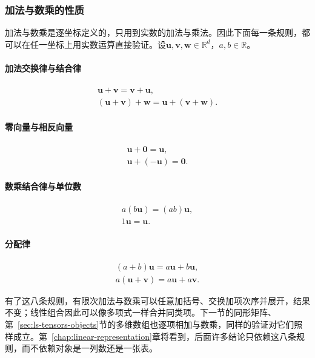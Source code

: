 \subsubsection{加法与数乘的性质}
\label{sec:ls-vector-operation-rules}

加法与数乘是逐坐标定义的，只用到实数的加法与乘法。因此下面每一条规则，都可以在任一坐标上用实数运算直接验证。设$\bm u,\bm v,\bm w\in\mathbb R^d$，$a,b\in\mathbb R$。

\paragraph{加法交换律与结合律}
\[
 \begin{gathered}
 \bm u+\bm v=\bm v+\bm u,\\
 (\bm u+\bm v)+\bm w=\bm u+(\bm v+\bm w).
 \end{gathered}
\]

\paragraph{零向量与相反向量}
\[
 \begin{gathered}
 \bm u+\bm0=\bm u,\\
 \bm u+(-\bm u)=\bm0.
 \end{gathered}
\]

\paragraph{数乘结合律与单位数}
\[
 \begin{gathered}
 a(b\bm u)=(ab)\bm u,\\
 1\bm u=\bm u.
 \end{gathered}
\]

\paragraph{分配律}
\[
 \begin{gathered}
 (a+b)\bm u=a\bm u+b\bm u,\\
 a(\bm u+\bm v)=a\bm u+a\bm v.
 \end{gathered}
\]

有了这八条规则，有限次加法与数乘可以任意加括号、交换加项次序并展开，结果不变；线性组合因此可以像多项式一样合并同类项。下一节的同形矩阵、第~\ref{sec:ls-tensors-objects}节的多维数组也逐项相加与数乘，同样的验证对它们照样成立。第~\ref{chap:linear-representation}章将看到，后面许多结论只依赖这八条规则，而不依赖对象是一列数还是一张表。

